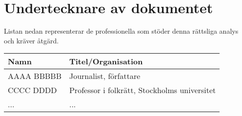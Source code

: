 \section{Undertecknare av dokumentet}
Listan nedan representerar de professionella som stöder denna rättsliga analys och kräver åtgärd.

\vspace{1cm}
\begin{tabular}{@{}p{}p{}@{}}
\textbf{Namn} & \textbf{Titel/Organisation} \\ \midrule
AAAA BBBBB & Journalist, författare \\
CCCC DDDD & Professor i folkrätt, Stockholms universitet \\
... & ... \\
\end{tabular}

\vfill

